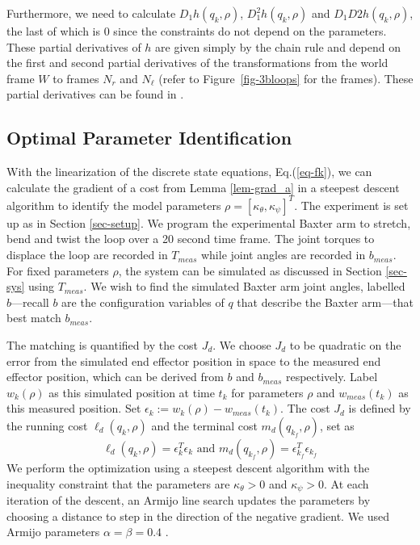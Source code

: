 \documentclass[letterpaper, 10pt, conference]{ieeeconf}
\begin{document}
Furthermore, we need to calculate $D_1h(q_k,\rho)$, $D_1^2h(q_k,\rho)$ and $D_1D2h(q_k,\rho)$, the last of which is $0$ since the constraints do not depend on the parameters.  These partial derivatives of $h$ are given simply by the chain rule and depend on the first and second partial derivatives of the transformations from the world frame $W$ to frames $N_r$ and $N_\ell$ (refer to Figure~\ref{fig-3bloops} for the frames).  These partial derivatives can be found in \cite{johnson_murphey_linearization}.  

\subsection{Optimal Parameter Identification}
With the linearization of the discrete state equations, Eq.(\ref{eq-fk}), we can calculate the gradient of a cost from Lemma \ref{lem-grad_a} in a steepest descent algorithm to identify the model parameters $\rho = [\kappa_\theta,\kappa_\psi]^T$.  The experiment is set up as in Section \ref{sec-setup}.  We program the experimental Baxter arm to stretch, bend and twist the loop over a 20 second time frame. The joint torques to displace the loop are recorded in $T_{meas}$ while joint angles are recorded in $b_{meas}$.    For fixed parameters $\rho$, the system can be simulated as discussed in Section \ref{sec-sys} using $T_{meas}$.  We wish to find the simulated Baxter arm joint angles, labelled $b$---recall $b$ are the configuration variables of $q$ that describe the Baxter arm---that best match $b_{meas}$.

The matching is quantified by the cost $J_d$.  We choose $J_d$ to be quadratic on the error from the simulated end effector position in space to the measured end effector position, which can be derived from $b$ and $b_{meas}$ respectively.   Label $w_k(\rho)$ as this simulated position at time $t_k$ for parameters $\rho$ and $w_{meas}(t_k)$ as this measured position.  Set $\epsilon_k := w_k(\rho)-w_{meas}(t_k)$.  The cost $J_d$ is defined by the running cost $\ell_d(q_k,\rho)$ and the terminal cost $m_d(q_{k_f},\rho)$, set as
\[
\ell_d(q_k,\rho) = \epsilon_k^T\epsilon_k \textrm{ and } m_d(q_{k_f},\rho) = \epsilon_{k_f}^T\epsilon_{k_f}
\]
We perform the optimization using a steepest descent algorithm with the inequality constraint that the parameters are $\kappa_\theta>0$ and $\kappa_\psi>0$.    At each iteration of the descent, an Armijo line search updates the parameters by choosing a distance to step in the direction of the negative gradient.  We used Armijo parameters $\alpha = \beta = 0.4$ \cite{armijo}.
\end{document}
